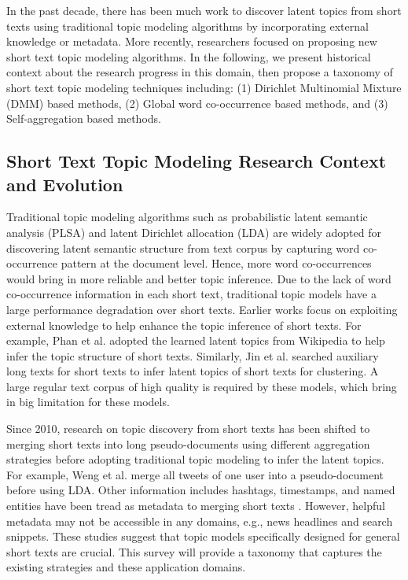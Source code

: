\documentclass[10pt,journal,compsoc]{IEEEtran}
\begin{document}
In the past decade, there has been much work to discover latent topics from short texts using traditional topic modeling algorithms by incorporating external knowledge or metadata. More recently, researchers focused on proposing new short text topic modeling algorithms. In the following, we present historical context about the research progress in this domain, then propose a taxonomy of short text topic modeling techniques including: (1) Dirichlet Multinomial Mixture (DMM) based methods, (2) Global word co-occurrence based methods, and (3) Self-aggregation based methods.

\subsection{Short Text Topic Modeling Research Context and Evolution}

Traditional topic modeling algorithms such as probabilistic latent semantic analysis (PLSA) \cite{hofmann1999probabilistic} and latent Dirichlet allocation (LDA) \cite{blei2003latent} are widely adopted for discovering latent semantic structure from text corpus by capturing word co-occurrence pattern at the document level. Hence, more word co-occurrences would bring in more reliable and better topic inference. Due to the lack of word co-occurrence information in each short text, traditional topic models have a large performance degradation over short texts. Earlier works focus on exploiting external knowledge to help enhance the topic inference of short texts. For example, Phan et al. \cite{phan2008learning} adopted the learned latent topics from Wikipedia to help infer the topic structure of short texts. Similarly, Jin et al. \cite{jin2011transferring} searched auxiliary long texts for short texts to infer latent topics of short texts for clustering. A large regular text corpus of high quality is required by these models, which bring in big limitation for these models.

Since 2010, research on topic discovery from short texts has been shifted to merging short texts into long pseudo-documents using different aggregation strategies before adopting traditional topic modeling to infer the latent topics. For example, Weng et al. \cite{weng2010twitterrank} merge all tweets of one user into a pseudo-document before using LDA. Other information includes hashtags, timestamps, and named entities have been tread as metadata to merging short texts \cite{hong2010empirical,mehrotra2013improving,zhao2011comparing}. However, helpful metadata may not be accessible in any domains, e.g., news headlines and search snippets. These studies suggest that topic models specifically designed for general short texts are crucial. This survey will provide a taxonomy that captures the existing strategies and these application domains.
\end{document}
